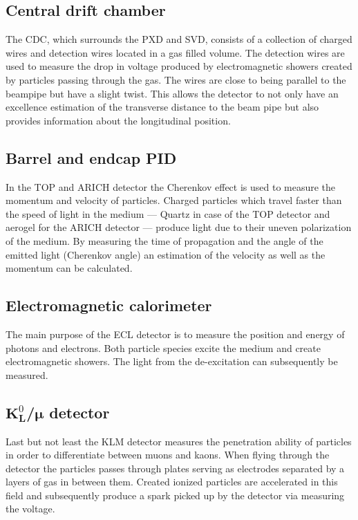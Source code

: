 \subsection{Central drift chamber}
\label{subsec:detector_system_tracking_detectors}

The CDC, which surrounds the PXD and SVD, consists of a collection of charged wires and detection wires located in a gas filled volume. The detection wires are used to measure the drop in voltage produced by electromagnetic showers created by particles passing through the gas. The wires are close to being parallel to the beampipe but have a slight twist. This allows the detector to not only have an excellence estimation of the transverse distance to the beam pipe but also provides information about the longitudinal position.

\subsection{Barrel and endcap PID}
\label{subsec:detector_system_barrel_and_endcap_pid}

In the TOP and ARICH detector the Cherenkov effect is used to measure the momentum and velocity of particles. Charged particles which travel faster than the speed of light in the medium --- Quartz in case of the TOP detector and aerogel for the ARICH detector --- produce light due to their uneven polarization of the medium. By measuring the time of propagation and the angle of the emitted light (Cherenkov angle) an estimation of the velocity as well as the momentum can be calculated.

\subsection{Electromagnetic calorimeter}
\label{subsec:detector_system_electromagnetic_calorimeter}

The main purpose of the ECL detector is to measure the position and energy of photons and electrons. Both particle species excite the medium and create electromagnetic showers. The light from the de-excitation can subsequently be measured.

\subsection{$\boldsymbol{K}^0_{\boldsymbol{L}}$/$\boldsymbol{\mu}$ detector}
\label{subsec:detector_system_k0lmu}

Last but not least the KLM detector measures the penetration ability of particles in order to differentiate between muons and kaons. When flying through the detector the particles passes through plates serving as electrodes separated by a layers of gas in between them. Created ionized particles are accelerated in this field and subsequently produce a spark picked up by the detector via measuring the voltage.

